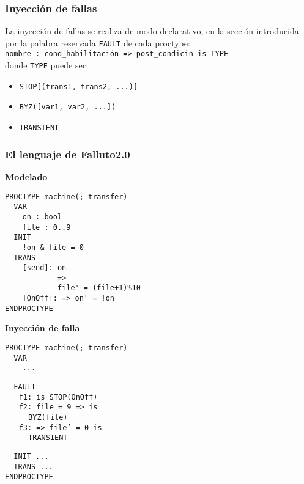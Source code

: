 \documentclass[serif]{beamer}
\begin{document}
\begin{frame}
\frametitle{Inyección de fallas}
La inyección de fallas se realiza de modo declarativo, en la 
sección introducida por la palabra reservada \texttt{FAULT} de 
cada proctype:\\[0.5cm]
\texttt{nombre : cond\_habilitaci\'on => post\_condicin is TYPE} \\[0.5cm]
donde \texttt{TYPE} puede ser: \\[0.5cm]
\begin{itemize}
\item \texttt{STOP[(trans1, trans2, ...)]}
\item \texttt{BYZ([var1, var2, ...])}
\item \texttt{TRANSIENT}
\end{itemize}
\end{frame}


\begin{frame}[fragile]
\frametitle{El lenguaje de Falluto2.0}
{\fontsize{7pt}{10pt}\selectfont
\begin{minipage}{0.45\textwidth}
{\large \bfseries Modelado}
\begin{framed} 
\begin{verbatim}
PROCTYPE machine(; transfer)
  VAR
    on : bool
    file : 0..9
  INIT
    !on & file = 0
  TRANS
    [send]: on 
            => 
            file' = (file+1)%10
    [OnOff]: => on' = !on
ENDPROCTYPE
\end{verbatim}
\end{framed}
\end{minipage}
\hspace{0.04\textwidth}
\begin{minipage}{0.45\textwidth}
{\large \bfseries Inyección de falla}
\begin{framed}
\begin{verbatim}
PROCTYPE machine(; transfer)
  VAR
    ...
\end{verbatim}
\texttt{\color{red}~~FAULT\\$~~~~~$
f1: is STOP(OnOff)\\$~~~~~$
f2: file = 9 => is\\$~~~~~~~~~~$ BYZ(file)\\$~~~~~$
f3: => file' = 0 is\\$~~~~~~~~~~$ TRANSIENT}
\begin{verbatim}
  INIT ...
  TRANS ...
ENDPROCTYPE
\end{verbatim}
\end{framed}
\end{minipage}
} %

\end{frame}
\end{document}
